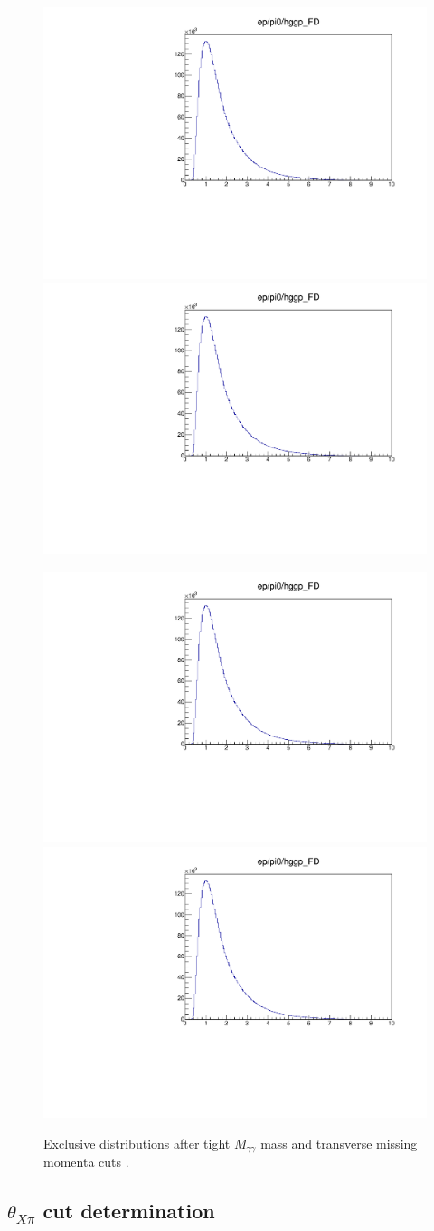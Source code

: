 \begin{figure}[hbt]
	\centering
	\includegraphics[page=43,width=0.45\linewidth]{figures/eppi0.exclusive.pdf}
	\includegraphics[page=44,width=0.45\linewidth]{figures/eppi0.exclusive.pdf}
	
	\includegraphics[page=45,width=0.45\linewidth]{figures/eppi0.exclusive.pdf}
    \includegraphics[page=47,width=0.45\linewidth]{figures/eppi0.exclusive.pdf}

	\caption{Exclusive distributions after tight $M_{\gamma\gamma}$ mass and transverse missing momenta cuts .}
	\label{fig:rawexclusive3}
\end{figure}

\subsection{$\theta_{X\pi}$ cut determination}


